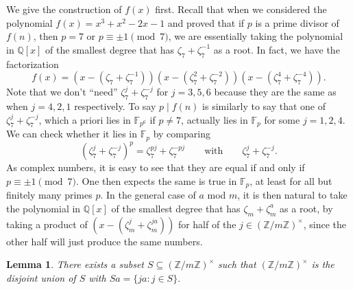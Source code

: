 \documentclass{article}
\def\Z{{\mathbb Z}}
\def\F{{\mathbb F}}
\def\Q{{\mathbb Q}}
\def\Z{{\mathbb Z}}
\def\F{{\mathbb F}}
\def\Q{{\mathbb Q}}
\def\C{{\mathbb C}}
\newtheorem{lemma}[subsection]{Lemma}
\begin{document}
\vspace{5pt}
\begin{comment}
    The condition $\nu_p(f(b))$ is something we haven't seen before. Suppose we have $p^2\mid f(b)$ instead. It is easy to check that
$$f(b + p) \equiv f(b) + pf'(b) \equiv pf'(b)\pmod{p^2}$$
since both sides are linear and it suffices to check it when $f(x) = x^n$. So if we have $p\nmid f'(b)$, then $\nu_p(f(b+p)) = 1$. We can make this happen by requiring that $f(x)$ and $f'(x)$ have no common roots in $\F_p$. We will learn about the \textbf{discriminant} $\Delta$ of $f(x)$ or more generally the \textbf{resultant} of two polynomials $f(x), g(x)$. The discriminant of a polynomial $f(x)$ is $0$ if and only if $f(x)$ and $f'(x)$ share a common factor. Hence if we make sure that $f(x)$ has no repeated roots in $\C$, then its discriminant is nonzero, and so for primes $p$ large enough, 
\end{comment}

We give the construction of $f(x)$ first. Recall that when we considered the polynomial $f(x) = x^3 + x^2 - 2x - 1$ and proved that if $p$ is a prime divisor of $f(n)$, then $p=7$ or $p\equiv\pm1\pmod{7}$, we are essentially taking the polynomial in $\Q[x]$ of the smallest degree that has $\zeta_7 + \zeta_7^{-1}$ as a root. In fact, we have the factorization
$$f(x) = (x - (\zeta_7 + \zeta_7^{-1}))(x - (\zeta_7^2 + \zeta_7^{-2}))(x - (\zeta_7^4 + \zeta_7^{-4})).$$
Note that we don't ``need'' $\zeta_7^j + \zeta_7^{-j}$ for $j = 3, 5, 6$ because they are the same as when $j = 4, 2, 1$ respectively.
To say $p\mid f(n)$ is similarly to say that one of $\zeta_7^j + \zeta_7^{-j}$, which a priori lies in $\F_{p^6}$ if $p\neq 7$, actually lies in $\F_p$ for some $j = 1,2,4.$ We can check whether it lies in $\F_p$ by comparing
$$(\zeta_7^j + \zeta_7^{-j})^p = \zeta_7^{pj} + \zeta_7^{-pj}\qquad\mbox{with}\qquad\zeta_7^j + \zeta_7^{-j}.$$
As complex numbers, it is easy to see that they are equal if and only if $p\equiv \pm1\pmod{7}$. One then expects the same is true in $\F_p$, at least for all but finitely many primes $p$. In the general case of $a$ mod $m$, it is then natural to take the polynomial in $\Q[x]$ of the smallest degree that has $\zeta_m + \zeta_m^a$ as a root, by taking a product of $(x - (\zeta_m^j + \zeta_m^{ja}))$ for half of the $j\in(\Z/m\Z)^\times$, since the other half will just produce the same numbers.

\begin{lemma}\label{lem:mquot}
    There exists a subset $S\subseteq(\Z/m\Z)^\times$ such that $(\Z/m\Z)^\times$ is the disjoint union of $S$ with $Sa = \{ja\colon j\in S\}.$
\end{lemma}
\end{document}
